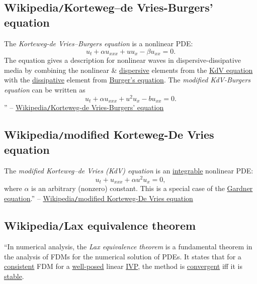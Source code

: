 \documentclass{article}
\begin{document}
\subsection{Wikipedia{\tt/}Korteweg--de Vries-Burgers' equation}
The {\it Korteweg-de Vries--Burgers equation} is a nonlinear PDE:
\begin{equation}
	\label{KdV Burgers}
	u_t + \alpha u_{xxx} + uu_x - \beta u_{xx} = 0.
\end{equation}
The equation gives a description for nonlinear waves in dispersive-dissipative media by combining the nonlinear \& \href{https://en.wikipedia.org/wiki/Dispersion_relation}{dispersive} elements from the \href{https://en.wikipedia.org/wiki/KdV_equation}{KdV equation} with the \href{https://en.wikipedia.org/wiki/Dissipative_system}{dissipative} element from \href{https://en.wikipedia.org/wiki/Burgers%27_equation}{Burger's equation}. The {\it modified KdV-Burgers equation} can be written as
\begin{equation}
	\label{modified KdV Burgers}
	u_t + \alpha u_{xxx} + u^2u_x - bu_{xx} = 0.
\end{equation}
'' -- \href{https://en.wikipedia.org/wiki/Korteweg-de_Vries-Burgers%27_equation}{Wikipedia{\tt/}Korteweg-de Vries-Burgers' equation}


\subsection{Wikipedia{\tt/}modified Korteweg-De Vries equation}
The {\it modified Korteweg–de Vries (KdV) equation} is an \href{https://en.wikipedia.org/wiki/Integrable_system}{integrable} nonlinear PDE:
\begin{equation}
	\label{modified KdV}
	u_t + u_{xxx} + \alpha u^2u_x = 0,
\end{equation}
where $\alpha$ is an arbitrary (nonzero) constant. This is a special case of the \href{https://en.wikipedia.org/wiki/Gardner_equation}{Gardner equation}.'' -- \href{https://en.wikipedia.org/wiki/Modified_Korteweg-De_Vries_equation}{Wikipedia{\tt/}modified Korteweg-De Vries equation}


\subsection{Wikipedia{\tt/}Lax equivalence theorem}
``In numerical analysis, the {\it Lax equivalence theorem} is a fundamental theorem in the analysis of FDMs for the numerical solution of PDEs. It states that for a \href{https://en.wikipedia.org/wiki/Numerical_methods_for_ordinary_differential_equations#Consistency_and_order}{consistent} FDM for a \href{https://en.wikipedia.org/wiki/Well-posed}{well-posed} linear \href{https://en.wikipedia.org/wiki/Initial_value_problem}{IVP}, the method is \href{https://en.wikipedia.org/wiki/Numerical_methods_for_ordinary_differential_equations#Convergence}{convergent} iff it is \href{https://en.wikipedia.org/wiki/Numerical_stability#Stability_in_numerical_differential_equations}{stable}.
\end{document}
